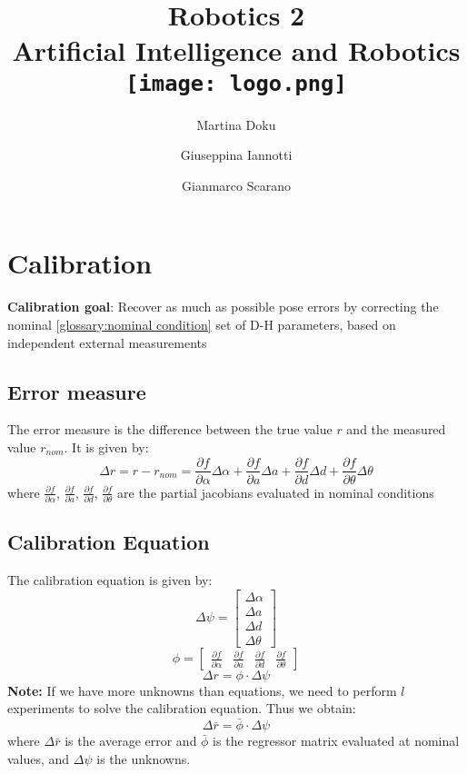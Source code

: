 \documentclass[a4paper,12pt]{article}
\title{
    \Huge{Robotics 2}\\
    \large{Artificial Intelligence and Robotics}\\
    \vspace{1cm}
    \texttt{[image: logo.png]}
}
\author{Martina Doku \and Giuseppina Iannotti \and Gianmarco Scarano}
\begin{document}
\maketitle
\newpage

\tableofcontents
\newpage

\section{Calibration}
\textbf{Calibration goal}:  Recover as 
much as possible pose
errors by correcting the nominal \ref{glossary:nominal condition}
set of D-H parameters,
based on independent external measurements
\subsection{Error measure}
The error measure is the difference between the true value $r$ and the
 measured value $r_{nom}$. It is given by:
\begin{equation}
  \Delta r = r - r_{nom} = \frac{\partial f}{\partial \alpha} \Delta \alpha + \frac{\partial f}{\partial a} \Delta a + \frac{\partial f}{\partial d} \Delta d + \frac{\partial f}{\partial \theta} \Delta \theta
\end{equation}
where $\frac{\partial f}{\partial \alpha}$, $\frac{\partial f}{\partial a}$, $\frac{\partial f}{\partial d}$, $\frac{\partial f}{\partial \theta}$ are the partial 
jacobians evaluated in nominal conditions
\subsection{Calibration Equation}
The calibration equation is given by:
\begin{equation}
    \Delta \psi = \begin{bmatrix}
        \Delta \alpha \\
        \Delta a \\
        \Delta d \\
        \Delta \theta
    \end{bmatrix}
\end{equation}
\begin{equation}
    \phi= \begin{bmatrix}
     \frac{\partial f}{\partial \alpha} & \frac{\partial f}{\partial a} & \frac{\partial f}{\partial d} & \frac{\partial f}{\partial \theta}
    \end{bmatrix}
\end{equation}
\begin{equation}
    \Delta r= \phi \cdot \Delta \psi
\end{equation}
\textbf{Note:} If we have more unknowns than equations, we need to perform 
$l$ experiments to solve the calibration equation. Thus we obtain:
\begin{equation}
    \Delta \bar{r}= \bar{\phi} \cdot \Delta \psi
\end{equation}
where $\Delta \bar{r}$ is the average error 
and $\bar{\phi}$ is the regressor matrix evaluated at nominal values,
and $\Delta \psi$ is the unknowns.
\end{document}
